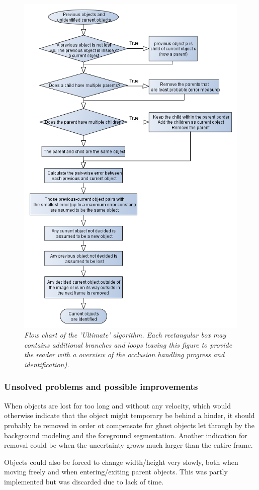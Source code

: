 \newpage
\begin{figure}[htb]
	\centering
	\includegraphics[width=123.5mm]{images/data_flow_identification.png}
	\caption{\textit{Flow chart of the 'Ultimate' algorithm. Each rectangular box may contains additional branches and loops leaving this figure to provide the reader with a overview of the occlusion handling progress and identification).}}
	\label{fig:ObjID_fig} %
\end{figure}

\subsubsection{Unsolved problems and possible improvements}
When objects are lost for too long and without any velocity, which would otherwise indicate that the object might temporary be behind a hinder, it should probably be removed in order ot compensate for ghost objects let through by the background modeling and the foreground segmentation. Another indication for removal could be when the uncertainty grows much larger than the entire frame.

Objects could also be forced to change width/height very slowly, both when moving freely and when entering/exiting parent objects. This was partly implemented but was discarded due to lack of time.